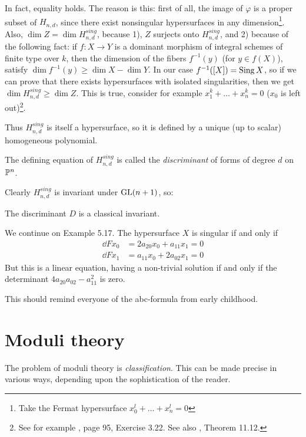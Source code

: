 \documentclass[11pt, english]{article}
\begin{document}
In fact, equality holds. The reason is this: first of all, the image of $\varphi$ is a proper subset of $H_{n,d}$, since there exist nonsingular hypersurfaces in any dimension\footnote{Take the Fermat hypersurface $x_0^l+\ldots+x_n^l=0$}. Also, $\dim Z = \dim H_{n,d}^{sing}$, because 1), $Z$ surjects onto $H_{n,d}^{sing}$, and 2) because of the following fact: if $f:X \to Y$ is a dominant morphism of integral schemes of finite type over $k$, then the dimension of the fibers $f^{-1}(y)$ (for $y \in f(X)$), satisfy $\dim f^{-1}(y) \geq \dim X - \dim Y$. In our case $f^{-1}([X])=\operatorname{Sing} X$, so if we can prove that there exists hypersurfaces with isolated singularities, then we get $\dim H_{n,d}^{sing} \geq \dim Z$. This is true, consider for example $x_1^k+\ldots+x_n^k=0$ ($x_0$ is left out)\footnote{See for example \cite{hartshorne}, page 95, Exercise 3.22. See also \cite{harris_alggeo}, Theorem 11.12.}.

Thus $H_{n,d}^{sing}$ is itself a hypersurface, so it is defined by a unique (up to scalar)  homogeneous polynomial.

\begin{defi}
 The defining equation of $H_{n,d}^{sing}$ is called the \emph{discriminant} of forms of degree $d$ on $\mathbb{P}^n$. 
\end{defi}

Clearly $H_{n,d}^{sing}$ is invariant under $\operatorname{GL}(n+1)$, so:
\begin{corr}
 The discriminant $D$ is a classical invariant.
\end{corr}

\begin{example}
We continue on Example 5.17. The hypersurface $X$ is singular if and only if
\begin{align*}
  \dd{F}{x_0} &= 2a_{20}x_0 + a_{11}x_1 = 0 \\
\dd{F}{x_1} &= a_{11}x_0 + 2a_{02} x_1 = 0
\end{align*}
But this is a linear equation, having a non-trivial solution if and only if the determinant $4a_{20}a_{02}-a_{11}^2$ is zero. 

This should remind everyone of the abc-formula from early childhood.
\end{example}

\section{Moduli theory}

The problem of moduli theory is \emph{classification}. This can be made precise in various ways, depending upon the sophistication of the reader.
\end{document}
